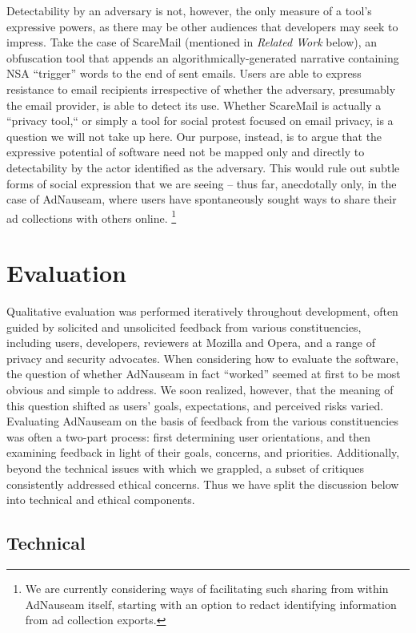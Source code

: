 \documentclass[conference]{IEEEtran}
\begin{document}
Detectability by an adversary is not, however, the only measure of a tool’s expressive powers, as there may be other audiences that developers may seek to impress. Take the case of ScareMail (mentioned in \emph{Related Work} below), an obfuscation tool that appends an algorithmically-generated narrative containing NSA “trigger” words to the end of sent emails. Users are able to express resistance to email recipients irrespective of whether the adversary, presumably the email provider, is able to detect its use. Whether ScareMail is actually a “privacy tool,“ or simply a tool for social protest focused on email privacy, is a question we will not take up here. Our purpose, instead, is to argue that the expressive potential of software need not be mapped only and directly to detectability by the actor identified as the adversary. This would rule out subtle forms of social expression that we are seeing -- thus far, anecdotally only, in the case of AdNauseam, where users have spontaneously sought ways to share their ad collections with others online.
\footnote{We are currently considering ways of facilitating such sharing from within AdNauseam itself, starting with an option to redact identifying information from ad collection exports.}


\section{Evaluation}

Qualitative evaluation was performed iteratively throughout development, often guided by solicited and unsolicited feedback from various constituencies, including users, developers, reviewers at Mozilla and Opera, and a range of privacy and security advocates. When considering how to evaluate the software, the question of whether AdNauseam in fact “worked” seemed at first to be most obvious and simple to address. We soon realized, however, that the meaning of this question shifted as users' goals, expectations, and perceived risks varied. Evaluating AdNauseam on the basis of feedback from the various constituencies was often a two-part process: first determining user orientations, and then examining feedback in light of their goals, concerns, and priorities. Additionally, beyond the technical issues with which we grappled, a subset of critiques consistently addressed ethical concerns. Thus we have split the discussion below into technical and ethical components.

\subsection{Technical}
\end{document}
